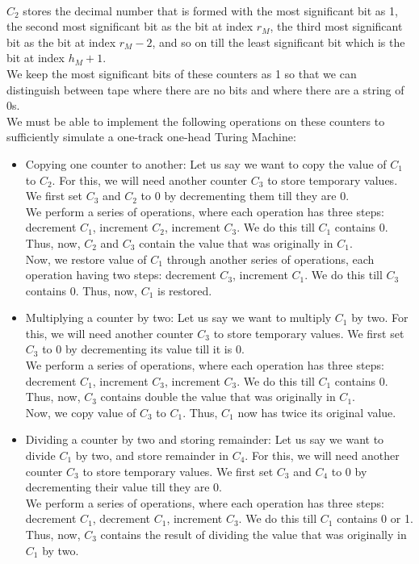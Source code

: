 \documentclass[12pt,a4paper]{article}
\begin{document}
\\$C_2$ stores the decimal number that is formed with the most significant bit as 1, the second most significant bit as the bit at index $r_M$, the third most significant bit as the bit at index $r_M - 2$, and so on till the least significant bit which is the bit at index $h_M + 1$.
\\We keep the most significant bits of these counters as 1 so that we can distinguish between tape where there are no bits and where there are a string of 0s.
\\We must be able to implement the following operations on these counters to sufficiently simulate a one-track one-head Turing Machine:
\begin{itemize}
    \item Copying one counter to another: Let us say we want to copy the value of $C_1$ to $C_2$. For this, we will need another counter $C_3$ to store temporary values. We first set $C_3$ and $C_2$ to 0 by decrementing them till they are 0.
    \\We perform a series of operations, where each operation has three steps: decrement $C_1$, increment $C_2$, increment $C_3$. We do this till $C_1$ contains 0. Thus, now, $C_2$ and $C_3$ contain the value that was originally in $C_1$.
    \\ Now, we restore value of $C_1$ through another series of operations, each operation having two steps: decrement $C_3$, increment $C_1$. We do this till $C_3$ contains 0. Thus, now, $C_1$ is restored.
    \item Multiplying a counter by two: Let us say we want to multiply $C_1$ by two. For this, we will need another counter $C_3$ to store temporary values. We first set $C_3$ to 0 by decrementing its value till it is 0.
    \\We perform a series of operations, where each operation has three steps: decrement $C_1$, increment $C_3$, increment $C_3$. We do this till $C_1$ contains 0. Thus, now, $C_3$ contains double the value that was originally in $C_1$.
    \\ Now, we copy value of $C_3$ to $C_1$. Thus, $C_1$ now has twice its original value.
    \item Dividing a counter by two and storing remainder: Let us say we want to divide $C_1$ by two, and store remainder in $C_4$. For this, we will need another counter $C_3$ to store temporary values. We first set $C_3$ and $C_4$ to 0 by decrementing their value till they are 0.
    \\We perform a series of operations, where each operation has three steps: decrement $C_1$, decrement $C_1$, increment $C_3$. We do this till $C_1$ contains 0 or 1. Thus, now, $C_3$ contains the result of dividing the value that was originally in $C_1$ by two.

\end{itemize}
\end{document}
